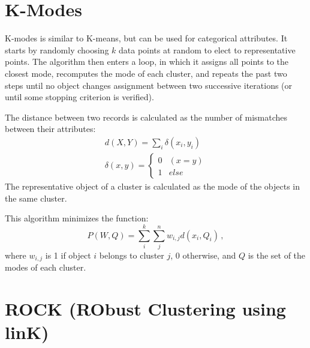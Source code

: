 \section{K-Modes}

K-modes is similar to K-means, but can be used for categorical attributes. It starts by randomly choosing $k$ data points at random to elect to representative points. The algorithm then enters a loop, in which it assigns all points to the closest mode, recomputes the mode of each cluster, and repeats the past two steps until no object changes assignment between two successive iterations (or until some stopping criterion is verified).

The distance between two records is calculated as the number of mismatches between their attributes:
\begin{gather*}
    d(X,Y) = \sum_i \delta(x_i, y_i) \\
    \delta(x,y) = \begin{cases}
        0 & (x = y) \\
        1 & else
    \end{cases}
\end{gather*}
The representative object of a cluster is calculated as the mode of the objects in the same cluster.

This algorithm minimizes the function:
\begin{equation*}
    P(W,Q) = \sum_{i}^k \sum_{j}^n w_{i,j} d(x_i, Q_i) \,,
\end{equation*}
where $w_{i,j}$ is 1 if object $i$ belongs to cluster $j$, 0 otherwise, and $Q$ is the set of the modes of each cluster.

\section{ROCK (RObust Clustering using linK)}

